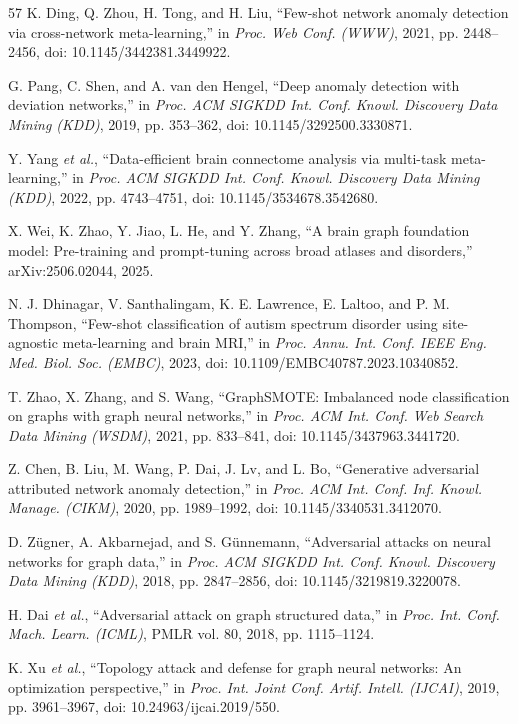 \begin{thebibliography}{57}
K. Ding, Q. Zhou, H. Tong, and H. Liu, ``Few-shot network anomaly detection via cross-network meta-learning,'' in \emph{Proc. Web Conf. (WWW)}, 2021, pp. 2448--2456, doi: 10.1145/3442381.3449922.

G. Pang, C. Shen, and A. van den Hengel, ``Deep anomaly detection with deviation networks,'' in \emph{Proc. ACM SIGKDD Int. Conf. Knowl. Discovery Data Mining (KDD)}, 2019, pp. 353--362, doi: 10.1145/3292500.3330871.

Y. Yang \emph{et al.}, ``Data-efficient brain connectome analysis via multi-task meta-learning,'' in \emph{Proc. ACM SIGKDD Int. Conf. Knowl. Discovery Data Mining (KDD)}, 2022, pp. 4743--4751, doi: 10.1145/3534678.3542680.

X. Wei, K. Zhao, Y. Jiao, L. He, and Y. Zhang, ``A brain graph foundation model: Pre-training and prompt-tuning across broad atlases and disorders,'' arXiv:2506.02044, 2025.

N. J. Dhinagar, V. Santhalingam, K. E. Lawrence, E. Laltoo, and P. M. Thompson, ``Few-shot classification of autism spectrum disorder using site-agnostic meta-learning and brain MRI,'' in \emph{Proc. Annu. Int. Conf. IEEE Eng. Med. Biol. Soc. (EMBC)}, 2023, doi: 10.1109/EMBC40787.2023.10340852.

T. Zhao, X. Zhang, and S. Wang, ``GraphSMOTE: Imbalanced node classification on graphs with graph neural networks,'' in \emph{Proc. ACM Int. Conf. Web Search Data Mining (WSDM)}, 2021, pp. 833--841, doi: 10.1145/3437963.3441720.

Z. Chen, B. Liu, M. Wang, P. Dai, J. Lv, and L. Bo, ``Generative adversarial attributed network anomaly detection,'' in \emph{Proc. ACM Int. Conf. Inf. Knowl. Manage. (CIKM)}, 2020, pp. 1989--1992, doi: 10.1145/3340531.3412070.

D. Z{\"u}gner, A. Akbarnejad, and S. G{\"u}nnemann, ``Adversarial attacks on neural networks for graph data,'' in \emph{Proc. ACM SIGKDD Int. Conf. Knowl. Discovery Data Mining (KDD)}, 2018, pp. 2847--2856, doi: 10.1145/3219819.3220078.

H. Dai \emph{et al.}, ``Adversarial attack on graph structured data,'' in \emph{Proc. Int. Conf. Mach. Learn. (ICML)}, PMLR vol. 80, 2018, pp. 1115--1124.

K. Xu \emph{et al.}, ``Topology attack and defense for graph neural networks: An optimization perspective,'' in \emph{Proc. Int. Joint Conf. Artif. Intell. (IJCAI)}, 2019, pp. 3961--3967, doi: 10.24963/ijcai.2019/550.


\end{thebibliography}
